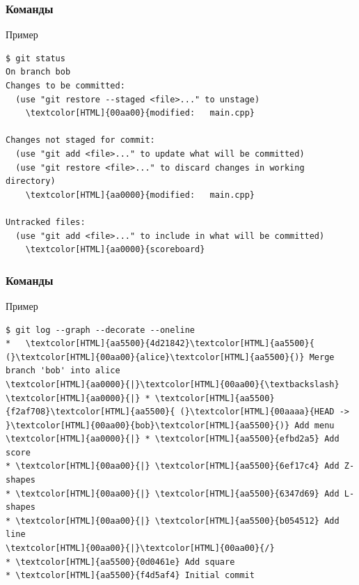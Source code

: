 \documentclass[pdf,russian,aspectratio=169]{beamer}
\begin{document}
\begin{frame}[fragile]
    \frametitle{Команды}
    \begin{exampleblock}{Пример}
        \begin{Verbatim}[fontsize=\relsize{-3},commandchars=\\\{\}]
$ git status
On branch bob
Changes to be committed:
  (use "git restore --staged <file>..." to unstage)
	\textcolor[HTML]{00aa00}{modified:   main.cpp}

Changes not staged for commit:
  (use "git add <file>..." to update what will be committed)
  (use "git restore <file>..." to discard changes in working directory)
	\textcolor[HTML]{aa0000}{modified:   main.cpp}

Untracked files:
  (use "git add <file>..." to include in what will be committed)
	\textcolor[HTML]{aa0000}{scoreboard}
        \end{Verbatim}
    \end{exampleblock}
\end{frame}

\begin{frame}[fragile]
    \frametitle{Команды}
    \begin{exampleblock}{Пример}
        \begin{Verbatim}[commandchars=\\\{\}]
$ git log --graph --decorate --oneline
*   \textcolor[HTML]{aa5500}{4d21842}\textcolor[HTML]{aa5500}{ (}\textcolor[HTML]{00aa00}{alice}\textcolor[HTML]{aa5500}{)} Merge branch 'bob' into alice
\textcolor[HTML]{aa0000}{|}\textcolor[HTML]{00aa00}{\textbackslash}
\textcolor[HTML]{aa0000}{|} * \textcolor[HTML]{aa5500}{f2af708}\textcolor[HTML]{aa5500}{ (}\textcolor[HTML]{00aaaa}{HEAD -> }\textcolor[HTML]{00aa00}{bob}\textcolor[HTML]{aa5500}{)} Add menu
\textcolor[HTML]{aa0000}{|} * \textcolor[HTML]{aa5500}{efbd2a5} Add score
* \textcolor[HTML]{00aa00}{|} \textcolor[HTML]{aa5500}{6ef17c4} Add Z-shapes
* \textcolor[HTML]{00aa00}{|} \textcolor[HTML]{aa5500}{6347d69} Add L-shapes
* \textcolor[HTML]{00aa00}{|} \textcolor[HTML]{aa5500}{b054512} Add line
\textcolor[HTML]{00aa00}{|}\textcolor[HTML]{00aa00}{/}
* \textcolor[HTML]{aa5500}{0d0461e} Add square
* \textcolor[HTML]{aa5500}{f4d5af4} Initial commit
        \end{Verbatim}
    \end{exampleblock}
\end{frame}
\end{document}
